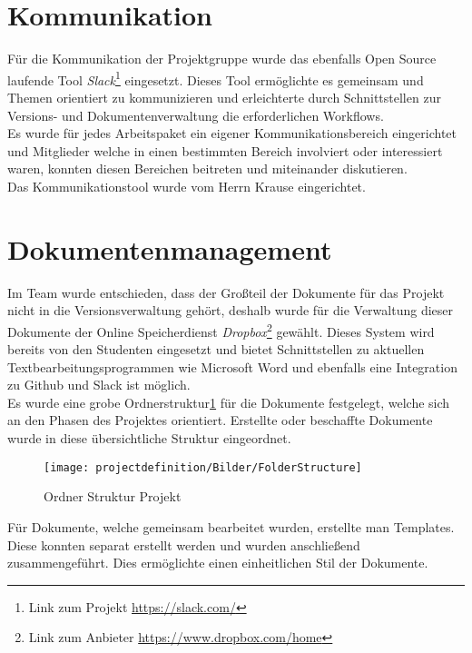 \section{Kommunikation}
Für die Kommunikation der Projektgruppe wurde das ebenfalls Open Source laufende Tool \textit{Slack}\footnote{Link zum Projekt \url{https://slack.com/}} eingesetzt. Dieses Tool ermöglichte es gemeinsam und Themen orientiert zu kommunizieren und erleichterte durch Schnittstellen zur Versions- und Dokumentenverwaltung die erforderlichen Workflows.\\
Es wurde für jedes Arbeitspaket ein eigener Kommunikationsbereich eingerichtet und Mitglieder welche in einen bestimmten Bereich involviert oder interessiert waren, konnten diesen Bereichen beitreten und miteinander diskutieren.\\
Das Kommunikationstool wurde vom Herrn Krause eingerichtet.

\section{Dokumentenmanagement}
Im Team wurde entschieden, dass der Großteil der Dokumente für das Projekt nicht in die Versionsverwaltung gehört, deshalb wurde für die Verwaltung dieser Dokumente der Online Speicherdienst \textit{Dropbox}\footnote{Link zum Anbieter \url{https://www.dropbox.com/home}} gewählt. Dieses System wird bereits von den Studenten eingesetzt und bietet Schnittstellen zu aktuellen Textbearbeitungsprogrammen wie Microsoft Word und ebenfalls eine Integration zu Github und Slack ist möglich.\\
Es wurde eine grobe Ordnerstruktur\ref{fig:folderStruct} für die Dokumente festgelegt, welche sich an den Phasen des Projektes orientiert. Erstellte oder beschaffte Dokumente wurde in diese übersichtliche Struktur eingeordnet.\\
\begin{figure}[h]
\texttt{[image: projectdefinition/Bilder/FolderStructure]}
\caption{Ordner Struktur Projekt}
\label{fig:folderStruct}
\end{figure}
Für Dokumente, welche gemeinsam bearbeitet wurden, erstellte man Templates. Diese konnten separat erstellt werden und wurden anschließend zusammengeführt. Dies ermöglichte einen einheitlichen Stil der Dokumente.
